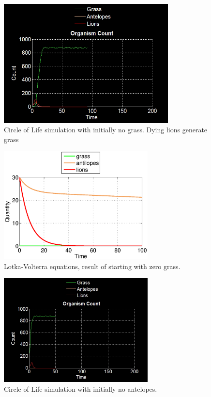 \documentclass[11pt]{article}
\begin{document}
\begin{figure}
\centering
\includegraphics[width=0.8\textwidth]{noGrassOnlyCount.png}
\caption{Circle of Life simulation with initially no grass. Dying lions generate grass}
\label{fig:noGrass}
\end{figure}

\begin{figure}[p]
\centering
\includegraphics[width=0.7\textwidth]{LotkaVolterraNoGrass.eps}
\caption{Lotka-Volterra equations, result of starting with zero grass.}
\label{fig:LotkaNoGrass}
\end{figure}

\begin{figure}
\centering
\includegraphics[width=0.7\textwidth]{noAntelopesOnlyCount.png}
\caption{Circle of Life simulation with initially no antelopes.}
\label{fig:noAntelopes}
\end{figure}
\end{document}
